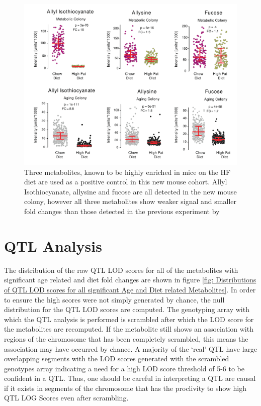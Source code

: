 \documentclass[a4paper,11pt,twoside]{book}
\begin{document}
\begin{figure}[t!]
		\centering
		\includegraphics[width=\linewidth]{3.Metabolomics/Top_3_Diet_Metabolites}
		\caption{ Three metabolites, known to be highly enriched in mice on the HF diet are used as a positive control in this new mouse cohort. Allyl Isothiocyanate, allysine and fucose are all detected in the new mouse colony, however all three metabolites show weaker signal and smaller fold changes than those detected in the previous experiment by \citeauthor{Williams2016SystemsFunction}}
		\label{fig:Top 3 Diet Metabolites}
\end{figure}
	

\section{QTL Analysis}
	
    The distribution of the raw QTL LOD scores for all of the metabolites with significant age related and diet fold changes are shown in figure \ref{fig: Distributions of QTL LOD scores for all significant Age and Diet related Metabolites}. In order to ensure the high scores were not simply generated by chance, the null distribution for the QTL LOD scores are computed. The genotyping array with which the QTL analysis is performed is scrambled after which the LOD score for the metabolites are recomputed. If the metabolite still shows an association with regions of the chromosome that has been completely scrambled, this means the association may have occurred by chance. A majority of the ‘real’ QTL have large overlapping segments with the LOD scores generated with the scrambled genotypes array indicating a need for a high LOD score threshold of 5-6 to be confident in a QTL. Thus, one should be careful in interpreting a QTL are causal if it exists in segments of the chromosome that has the proclivity to show high QTL LOG Scores even after scrambling. 
    
\end{document}
